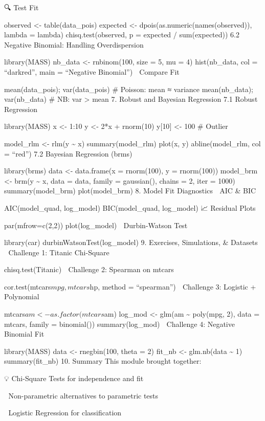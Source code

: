 \documentclass[
  letterpaper,
  DIV=11,
  numbers=noendperiod]{scrreprt}
\begin{document}
🔍 Test Fit

observed \textless- table(data\_pois) expected \textless-
dpois(as.numeric(names(observed)), lambda = lambda) chisq.test(observed,
p = expected / sum(expected)) 6.2 Negative Binomial: Handling
Overdispersion

library(MASS) nb\_data \textless- rnbinom(100, size = 5, mu = 4)
hist(nb\_data, col = ``darkred'', main = ``Negative Binomial'') 🔬
Compare Fit

mean(data\_pois); var(data\_pois) \# Poisson: mean ≈ variance
mean(nb\_data); var(nb\_data) \# NB: var \textgreater{} mean 7. Robust
and Bayesian Regression 7.1 Robust Regression

library(MASS) x \textless- 1:10 y \textless- 2*x + rnorm(10) y{[}10{]}
\textless- 100 \# Outlier

model\_rlm \textless- rlm(y \textasciitilde{} x) summary(model\_rlm)
plot(x, y) abline(model\_rlm, col = ``red'') 7.2 Bayesian Regression
(brms)

library(brms) data \textless- data.frame(x = rnorm(100), y = rnorm(100))
model\_brm \textless- brm(y \textasciitilde{} x, data = data, family =
gaussian(), chains = 2, iter = 1000) summary(model\_brm)
plot(model\_brm) 8. Model Fit Diagnostics 🔎 AIC \& BIC

AIC(model\_quad, log\_model) BIC(model\_quad, log\_model) 📈 Residual
Plots

par(mfrow=c(2,2)) plot(log\_model) 🧪 Durbin-Watson Test

library(car) durbinWatsonTest(log\_model) 9. Exercises, Simulations, \&
Datasets 🧠 Challenge 1: Titanic Chi-Square

chisq.test(Titanic) 🧠 Challenge 2: Spearman on mtcars

cor.test(mtcars\(mpg, mtcars\)hp, method = ``spearman'') 🧠 Challenge 3:
Logistic + Polynomial

mtcars\(am <- as.factor(mtcars\)am) log\_mod \textless- glm(am
\textasciitilde{} poly(mpg, 2), data = mtcars, family = binomial())
summary(log\_mod) 🧠 Challenge 4: Negative Binomial Fit

library(MASS) data \textless- rnegbin(100, theta = 2) fit\_nb \textless-
glm.nb(data \textasciitilde{} 1) summary(fit\_nb) 10. Summary This
module brought together:

💡 Chi-Square Tests for independence and fit

🧱 Non-parametric alternatives to parametric tests

🔁 Logistic Regression for classification
\end{document}
